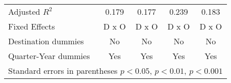 \begin{table}[htbp]
\begin{tabular}{l*{4}{c}}
Adjusted \(R^{2}\)  &       0.179         &       0.177         &       0.239         &       0.183         \\
Fixed Effects       &       D x O         &       D x O         &       D x O         &       D x O         \\
Destination dummies &          No         &          No         &          No         &          No         \\
Quarter-Year dummies&         Yes         &         Yes         &         Yes         &         Yes         \\
\hline\hline
\multicolumn{5}{l}{Standard errors in parentheses \sym{*} \(p<0.05\), \sym{**} \(p<0.01\), \sym{***} \(p<0.001\)}\\
\end{tabular}
\end{table}
